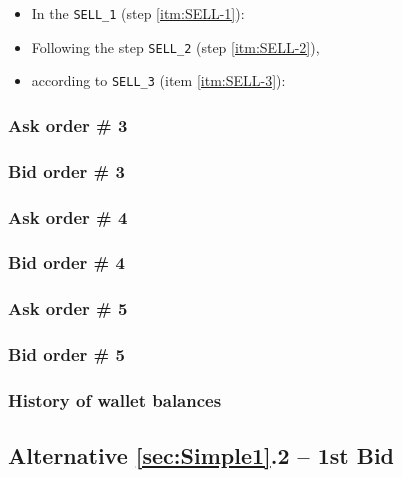 \documentclass[a4paper,11pt]{article}
\begin{document}
\begin{itemize}
    \item  In the {\tt SELL\_1} (step \ref{itm:SELL-1}):
    	
    \item Following the step {\tt SELL\_2} (step \ref{itm:SELL-2}), 
	
    \item according to {\tt SELL\_3} (item \ref{itm:SELL-3}):

\end{itemize}

	
\subsubsection{Ask order \# 3} 
	
\subsubsection{Bid order \# 3} 
	
\subsubsection{Ask order \# 4}
	
\subsubsection{Bid order \# 4}
	
\subsubsection{Ask order \# 5} 
	
\subsubsection{Bid order \# 5} 
	
\subsubsection{History of wallet balances} 

\subsection{Alternative \ref{sec:Simple1}.2 -- 1st Bid}
\end{document}
